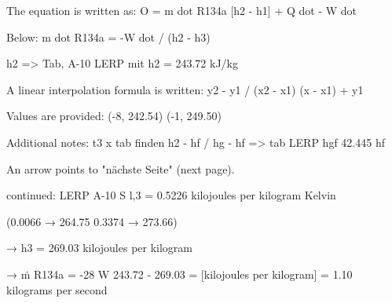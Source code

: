 The equation is written as:  
O = m dot R134a [h2 - h1] + Q dot - W dot  

Below:  
m dot R134a = -W dot / (h2 - h3)  

h2 => Tab, A-10 LERP mit  
h2 = 243.72 kJ/kg  

A linear interpolation formula is written:  
y2 - y1 / (x2 - x1) (x - x1) + y1  

Values are provided:  
(-8, 242.54)  
(-1, 249.50)  

Additional notes:  
t3 x tab finden  
h2 - hf / hg - hf => tab LERP hgf 42.445 hf  

An arrow points to "nächste Seite" (next page).

continued:  
LERP A-10  
S l,3 = 0.5226 kilojoules per kilogram Kelvin  

(0.0066 → 264.75  
0.3374 → 273.66)  

→ h3 = 269.03 kilojoules per kilogram  

→ ṁ R134a = -28 W  
243.72 - 269.03 = [kilojoules per kilogram]  
= 1.10 kilograms per second